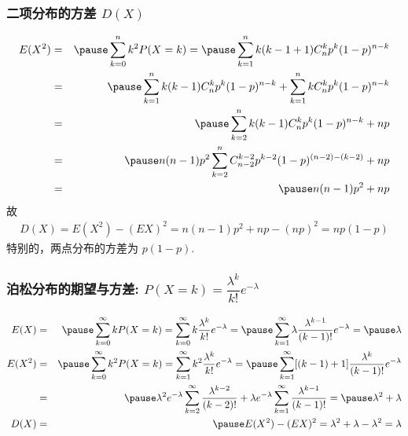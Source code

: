 \documentclass[Prob-All.tex]{subfiles}
\begin{document}
	\begin{frame}
		\frametitle{二项分布的方差 $D (X)$}
		\vspace{-0.6cm}
		\begin{eqnarray*}
			E(X^2)&=&\pause \sum_{k=0}^nk^2P(X=k)=\pause \sum_{k=1}^nk(k-1+1)C_n^kp^k(1-p)^{n-k}\\
			&=&\pause \sum_{k=1}^{n}k(k-1)C_n^kp^k(1-p)^{n-k}+\sum_{k=1}^{n}kC_n^kp^k(1-p)^{n-k}\\
			&=&\pause \sum_{k=2}^{n}k(k-1)C_n^kp^k(1-p)^{n-k}+np\\
			&=&\pause n(n-1)p^2\sum_{k=2}^nC_{n-2}^{k-2}p^{k-2}(1-p)^{(n-2)-(k-2)}+np\\
			&=&\pause n(n-1)p^2+np
		\end{eqnarray*}
		\pause 故
		\begin{eqnarray*}
			D(X)=E(X^2)-(EX)^2=n(n-1)p^2+np-(np)^2=np(1-p)
		\end{eqnarray*}
		\pause 特别的，两点分布的方差为 $p (1-p)$.
	\end{frame}
	\begin{frame}
		\frametitle{泊松分布的期望与方差: $P (X=k)=\dfrac{\lambda^k}{k!} e^{-\lambda}$}
		\begin{eqnarray*}
			E(X)&=&\pause \sum_{k=0}^\infty k P(X=k)=\sum_{k=0}^\infty k \dfrac{\lambda^k}{k!}e^{-\lambda}=\pause \sum_{k=1}^\infty  \lambda\dfrac{\lambda^{k-1}}{(k-1)!}e^{-\lambda}=\pause \lambda\\
			E(X^2)&=&\pause \sum_{k=0}^\infty k^2 P(X=k)=\sum_{k=1}^\infty k^2 \dfrac{\lambda^k}{k!}e^{-\lambda}=\pause \sum_{k=1}^\infty[(k-1)+1]\dfrac{\lambda^{k}}{(k-1)!}e^{-\lambda}\\
			&=&\pause \lambda^2e^{-\lambda}\sum_{k=2}^\infty \dfrac{\lambda^{k-2}}{(k-2)!}+\lambda e^{-\lambda}\sum_{k=1}^\infty  \dfrac{\lambda^{k-1}}{(k-1)!}=\pause \lambda^2+\lambda\\
			D(X)&=&\pause E(X^2)-(EX)^2=\lambda^2+\lambda-\lambda^2=\lambda
		\end{eqnarray*}

	\end{frame}
\end{document}
